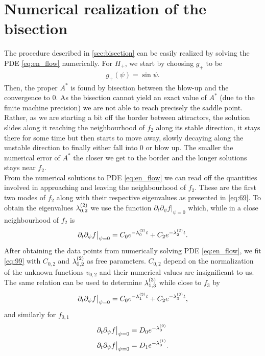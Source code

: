 \section{Numerical realization of the bisection}
\label{sec:numer-real-mount}

The procedure described in \ref{sec:bisection} can be easily realized
by solving the PDE \eqref{eq:en_flow} numerically. For $H_+$, we start
by choosing $g_+$ to be
\begin{align}
  \label{eq:98}
  g_+(\psi)=\sin\psi.
\end{align}
Then, the proper $A^*$ is found by bisection between the blow-up and
the convergence to $0$. As the bisection cannot yield an exact value
of $A^*$ (due to the finite machine precision) we are not able to
reach precisely the saddle point. Rather, as we are starting a bit off
the border between attractors, the solution slides along it reaching
the neighbourhood of $f_2$ along its stable direction, it stays there
for some time but then starts to move away, slowly decaying along the
unstable direction to finally either fall into $0$ or blow up. The
smaller the numerical error of $A^*$ the closer we get to the border
and the longer solutions stays near $f_2$.\\

From the numerical solutions to PDE \eqref{eq:en_flow} we can read off
the quantities involved in approaching and leaving the neighbourhood
of $f_2$. These are the first two modes of $f_2$ along with their
respective eigenvalues as presented in \eqref{eq:69}. To obtain the
eigenvalues $\lb{2}{0,2}$ we use the function $\partial_t\partial_\psi
f\big|_{\psi=0}$ which, while in a close neighbourhood of $f_2$ is
\begin{align}
  \label{eq:99}
  \partial_t\partial_\psi
  f\big|_{\psi=0}=C_0e^{-\lb{2}{0}t}+C_2e^{-\lb{2}{2}t}.
\end{align}
After obtaining the data points from numerically solving PDE
\eqref{eq:en_flow}, we fit \eqref{eq:99} with $C_{0,2}$ and
$\lb{2}{0,2}$ as free parameters.  $C_{0,2}$ depend on the
normalization of the unknown functions $v_{0,2}$ and their numerical
values are insignificant to us. The same relation can be used to
determine $\lb{3}{1,3}$ while close to $f_3$ by
\begin{align}
  \label{eq:101}
  \partial_t\partial_\psi
  f\big|_{\psi=0}=C_0e^{-\lb{3}{1}t}+C_2e^{-\lb{3}{3}t},
\end{align}
and similarly for $f_{0,1}$
\begin{align}
  \label{eq:100}
  \partial_t\partial_\psi f\big|_{\psi=0}&=D_{0}e^{-\lb{0}{0}} \\
  \label{eq:102}
  \partial_t\partial_\psi f\big|_{\psi=0}&=D_{1}e^{-\lb{1}{0}}.
\end{align}

